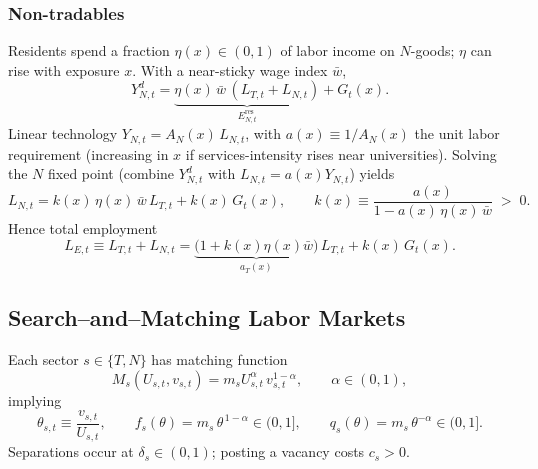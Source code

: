 \subsubsection*{Non-tradables}
Residents spend a fraction $\eta(x)\in(0,1)$ of labor income on $N$-goods; $\eta$ can rise with exposure $x$. With a near-sticky wage index $\bar w$,
\begin{equation}
	Y_{N,t}^d=\underbrace{\eta(x)\,\bar w\,(L_{T,t}+L_{N,t})}_{E_{N,t}^{\text{res}}} + G_t(x).
	\label{eq:YN_demand}
\end{equation}
Linear technology $Y_{N,t}=A_N(x)\,L_{N,t}$, with $a(x)\equiv 1/A_N(x)$ the unit labor requirement (increasing in $x$ if services-intensity rises near universities). Solving the $N$ fixed point (combine $Y_{N,t}^d$ with $L_{N,t}=a(x)Y_{N,t}$) yields
\begin{equation}
	L_{N,t} = k(x)\,\eta(x)\,\bar w\,L_{T,t} + k(x)\,G_t(x),
	\qquad
	k(x)\equiv \frac{a(x)}{1-a(x)\,\eta(x)\,\bar w}\;>\;0.
	\label{eq:LN_fixed_point}
\end{equation}
Hence total employment
\begin{equation}
	L_{E,t}\equiv L_{T,t}+L_{N,t}=\underbrace{\big(1+k(x)\eta(x)\bar w\big)}_{a_T(x)}\,L_{T,t}+k(x)\,G_t(x).
	\label{eq:LE_total}
\end{equation}

\subsection*{Search–and–Matching Labor Markets}
Each sector $s\in\{T,N\}$ has matching function
\begin{equation}
	M_s(U_{s,t},v_{s,t})=m_s U_{s,t}^{\alpha}\,v_{s,t}^{1-\alpha},\qquad \alpha\in(0,1),
\end{equation}
implying
\begin{equation}
	\theta_{s,t}\equiv \frac{v_{s,t}}{U_{s,t}},\qquad
	f_s(\theta)=m_s\,\theta^{\,1-\alpha}\in(0,1],\qquad
	q_s(\theta)=m_s\,\theta^{-\alpha}\in(0,1].
	\label{eq:f_q_defs}
\end{equation}
Separations occur at $\delta_s\in(0,1)$; posting a vacancy costs $c_s>0$.

